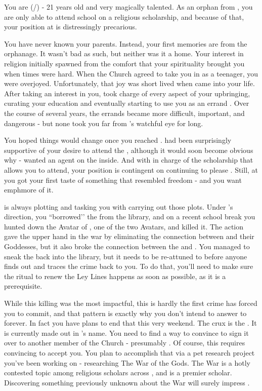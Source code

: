 \documentclass[char]{GL2020}
\begin{document}
\name{\cScholarship{}}

You are \cScholarship{} (\cScholarship{\they}/\cScholarship{\them}) - 21 years old and very magically talented. As an orphan from \pTech{}, you are only able to attend school on a religious scholarship, and because of that, your position at \pSchool{} is distressingly precarious.

You have never known your parents. Instead, your first memories are from the orphanage. It wasn’t bad as such, but neither was it a home. Your interest in religion initially spawned from the comfort that your spirituality brought you when times were hard. When the Church agreed to take you in as a teenager, you were overjoyed. Unfortunately, that joy was short lived when \cAntiChup{} came into your life. After taking an interest in you, \cAntiChup{} took charge of every aspect of your upbringing, curating your education and eventually starting to use you as an errand \cScholarship{\kid}. Over the course of several years, the errands became more difficult, important, and dangerous - but none took you far from \cAntiChup{}’s watchful eye for long.

You hoped things would change once you reached \pSchool{}. \cAntiChup{} had been surprisingly supportive of your desire to attend the \pSc{}, although it would soon become obvious why - \cAntiChup{\they} wanted an agent on the inside. And with \cAntiChup{} in charge of the scholarship that allows you to attend, your position is contingent on continuing to please \cAntiChup{\them}. Still, at \pSchool{} you got your first taste of something that resembled freedom - and you want emph{more} of it.

\cAntiChup{} is always plotting and tasking you with carrying out those plots. Under \cAntiChup{}’s direction, you ``borrowed’’ the \iNet{} from the \pSc{} library, and on a recent school break you hunted down the Avatar of \cEbb{\full}, one of the two \pShip{} Avatars, and killed it. The action gave \pTech{} the upper hand in the war by eliminating the connection between \pShip{} and their Goddesses, but it also broke the connection between the \iNet{} and \pShip{}. You managed to sneak the \iNet{} back into the library, but it needs to be re-attuned to \pShip{} before anyone finds out and traces the crime back to you. To do that, you’ll need to make sure the ritual to renew the Ley Lines happens as soon as possible, as it is a prerequisite.

While this killing was the most impactful, this is hardly the first crime \cAntiChup{} has forced you to commit, and that pattern is exactly why you don’t intend to answer to \cAntiChup{} forever. In fact you have plans to end that this very weekend. The crux is the \iScholarship{}. It is currently made out in \cAntiChup{}’s name. You need to find a way to convince \cAntiChup{} to sign it over to another member of the Church - presumably \cBeetle{}. Of course, this requires convincing \cBeetle{} to accept you. You plan to accomplish that via a pet research project you’ve been working on - researching The War of the Gods. The War is a hotly contested topic among religious scholars across \pEarth{}, and \cBeetle{} is a premier scholar. Discovering something previously unknown about the War will surely impress \cBeetle{\them}.
\end{document}
